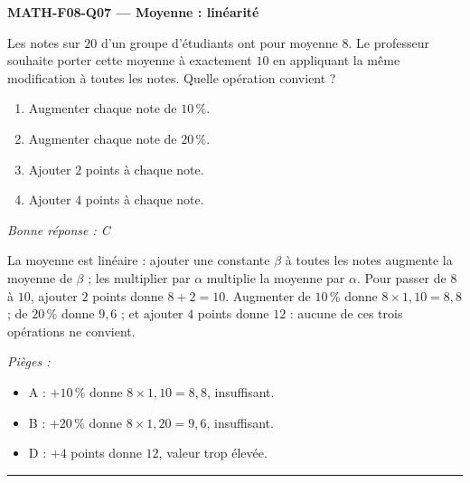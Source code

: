 \documentclass[11pt,a4paper]{article}
\begin{document}
\noindent\textbf{MATH-F08-Q07 --- Moyenne : linéarité}\par
Les notes sur $20$ d'un groupe d'étudiants ont pour moyenne $8$. Le professeur souhaite porter cette moyenne à exactement $10$ en appliquant la même modification à toutes les notes. Quelle opération convient ?
\begin{enumerate}[label=\Alph*)]
\item Augmenter chaque note de $10\,\%$.
\item Augmenter chaque note de $20\,\%$.
\item Ajouter $2$ points à chaque note.
\item Ajouter $4$ points à chaque note.
\end{enumerate}
\textit{Bonne réponse : C}\par
La moyenne est linéaire : ajouter une constante $\beta$ à toutes les notes augmente la moyenne de $\beta$ ; les multiplier par $\alpha$ multiplie la moyenne par $\alpha$. Pour passer de $8$ à $10$, ajouter $2$ points donne $8+2=10$. Augmenter de $10\,\%$ donne $8\times1{,}10=8{,}8$ ; de $20\,\%$ donne $9{,}6$ ; et ajouter $4$ points donne $12$ : aucune de ces trois opérations ne convient.\par
\textit{Pièges :}
\begin{itemize}
\item A : $+10\,\%$ donne $8\times1{,}10=8{,}8$, insuffisant.
\item B : $+20\,\%$ donne $8\times1{,}20=9{,}6$, insuffisant.
\item D : $+4$ points donne $12$, valeur trop élevée.
\end{itemize}
\vspace{8pt}\hrule\vspace{8pt}
\end{document}
